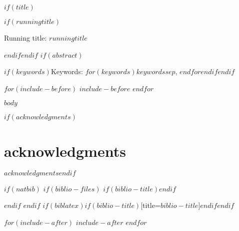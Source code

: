 \documentclass[$if(fontsize)$$fontsize$,$endif$$if(lang)$$lang$,$endif$$if(papersize)$$papersize$,$endif$$for(classoption)$$classoption$$sep$,$endfor$]{$documentclass$}
\affil{$for(author)$$author.email$$sep$, $endfor$}
\renewcommand{\refname}{\bfseries\large\uppercase{references}}
\begin{document}
\doublespacing
\raggedright

$if(title)$\maketitle$if(runningtitle)$\begin{center}Running title: $runningtitle$\end{center}$endif$\newpage$endif$
$if(abstract)$\begin{abstract}\noindent$abstract$\end{abstract}$if(keywords)$\bigskip\bigskip\bigskip Keywords: $for(keywords)$$keywords$$sep$, $endfor$$endif$\newpage$endif$

$for(include-before)$
$include-before$
$endfor$

$body$

\cleardoublepage

$if(acknowledgments)$\section*{acknowledgments}$acknowledgments$\cleardoublepage$endif$


$if(natbib)$
$if(biblio-files)$
$if(biblio-title)$\renewcommand\refname{$biblio-title$}$endif$

$endif$
$endif$
$if(biblatex)$\printbibliography$if(biblio-title)$[title=$biblio-title$]$endif$$endif$

\cleardoublepage
\listoffigures

$for(include-after)$
$include-after$
$endfor$

\end{document}

